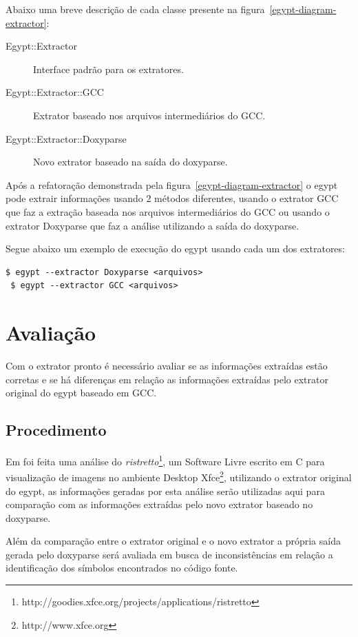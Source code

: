 Abaixo uma breve descrição de cada classe presente na
figura~\ref{egypt-diagram-extractor}:

\begin{description}
\item[Egypt::Extractor] Interface padrão para os extratores.
\item[Egypt::Extractor::GCC] Extrator baseado nos arquivos intermediários do GCC.
\item[Egypt::Extractor::Doxyparse] Novo extrator baseado na saída do doxyparse.
\end{description}

Após a refatoração demonstrada pela figura~\ref{egypt-diagram-extractor} o
egypt pode extrair informações usando 2 métodos diferentes, usando o extrator
GCC que faz a extração baseada nos arquivos intermediários do GCC ou usando o
extrator Doxyparse que faz a análise utilizando a saída do doxyparse.

Segue abaixo um exemplo de execução do egypt usando cada um dos extratores:

\begin{Verbatim}[frame=single,fontsize=\relsize{-2},fontfamily=courier]
 $ egypt --extractor Doxyparse <arquivos>
 $ egypt --extractor GCC <arquivos>
\end{Verbatim}

\chapter{Avaliação} \label{ch:avaliacao}

Com o extrator pronto é necessário avaliar se as informações extraídas estão
corretas e se há diferenças em relação as informações extraídas pelo extrator
original do egypt baseado em GCC.

\section{Procedimento}

Em \cite{structuralComplexityEvolution} foi feita uma análise do {\it
ristretto}\footnote{http://goodies.xfce.org/projects/applications/ristretto},
um Software Livre escrito em C para visualização de imagens no ambiente Desktop
Xfce\footnote{http://www.xfce.org}, utilizando o extrator original do egypt, as
informações geradas por esta análise serão utilizadas aqui para comparação com
as informações extraídas pelo novo extrator baseado no doxyparse.

Além da comparação entre o extrator original e o novo extrator a própria saída
gerada pelo doxyparse será avaliada em busca de inconsistências em relação a
identificação dos símbolos encontrados no código fonte.

